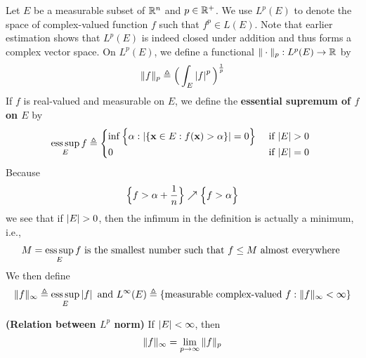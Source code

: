 \documentclass{report}
\begin{document}
\begin{mdframed}
  Let $E$ be a measurable subset of $\mathbb{R}^n$ and  $p \in \mathbb{R}^+$. We use $L^p(E)$ to denote the space of complex-valued function $f$ such that $f^p \in L(E)$. Note that earlier estimation shows that $L^p(E)$ is indeed closed under addition and thus forms a complex vector space. On $L^p(E)$, we define a functional $\| \cdot \|_p:L^p(E)\rightarrow \mathbb{R}$ by 
\begin{align*}
\| f \|_{p}\triangleq \Big( \int_E \left|f\right|^p \Big)^{\frac{1}{p}}
\end{align*}
If $f$ is real-valued and measurable on $E$, we define the \textbf{essential supremum of $f$ on $E$} by 
\begin{align*}
\esssup_E f\triangleq \begin{cases}
  \inf \bset{\alpha : \abso{\set{\textbf{x}\in E: f(\textbf{x})> \alpha } }=0}& \text{ if $\abso{E}>0$ }\\
   0& \text{ if $\abso{E}=0$ }
\end{cases}
\end{align*}
Because 
\begin{align*}
\Big\{ f>\alpha + \frac{1}{n} \Big\}\nearrow \Big\{ f>\alpha  \Big\}
\end{align*}
we see that if $\abso{E}>0$, then the infimum in the definition is actually a minimum, i.e.,  
\begin{align*}
M=\operatorname*{ess\,sup}_E f\text{ is the smallest number such that }f\leq M\text{ almost everywhere }
\end{align*}
We then define 
\begin{align*}
\| f \|_{\infty}\triangleq  \operatorname*{ess\,sup}_E \left|f\right|\text{ and }L^{\infty}(E)\triangleq \{ \text{measurable complex-valued }f: \| f \|_{\infty }<\infty \}
\end{align*}
\end{mdframed}
\begin{theorem}
  \textbf{(Relation between $L^p$ norm)} If $\left|E\right|<\infty$, then 
\begin{align*}
\| f \|_{\infty}=\lim_{p\to \infty} \| f \|_p
\end{align*}
\end{theorem}
\end{document}
